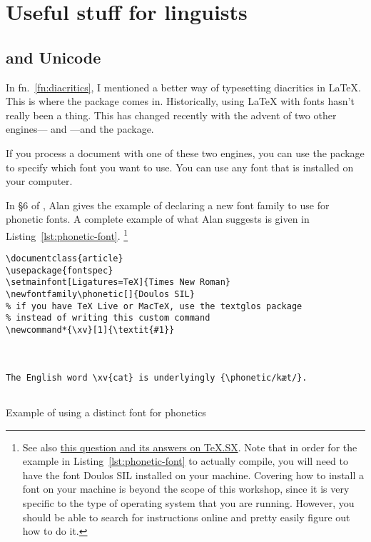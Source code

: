 
\section{Useful stuff for linguists}
\label{sec:useful-stuff-for-linguists}

\subsection{ and Unicode}
\label{subsec:fontspec-and-unicode}

In fn.~\ref{fn:diacritics}, I mentioned a better way of typesetting diacritics in \LaTeX.
This is where the  package comes in.
Historically, using \LaTeX{} with fonts hasn't really been a thing.
This has changed recently with the advent of two other engines--- and ---and the  package.

If you process a document with one of these two engines, you can use the  package to specify which font you want to use.
You can use any font that is installed on your computer.

In \S6 of , Alan gives the example of declaring a new font family to use for phonetic fonts.
A complete example of what Alan suggests is given in Listing~\ref{lst:phonetic-font}.%
\footnote{%
See also \href{http://tex.stackexchange.com/q/25249/32888}{this question and its answers on TeX.SX}.
Note that in order for the example in Listing~\ref{lst:phonetic-font} to actually compile, you will need to have the font Doulos SIL installed on your machine.
Covering how to install a font on your machine is beyond the scope of this workshop, since it is very specific to the type of operating system that you are running.
However, you should be able to search for instructions online and pretty easily figure out how to do it.%
}

\begin{listing}[htbp]
	\centering
	\begin{verbatim}
\documentclass{article}
\usepackage{fontspec}
\setmainfont[Ligatures=TeX]{Times New Roman}
\newfontfamily\phonetic[]{Doulos SIL}
% if you have TeX Live or MacTeX, use the textglos package
% instead of writing this custom command
\newcommand*{\xv}[1]{\textit{#1}}



The English word \xv{cat} is underlyingly {\phonetic/kæt/}.


	\end{verbatim}
	\caption{Example of using a distinct font for phonetics}
	\label{lst:phonetic-font}
\end{listing}

